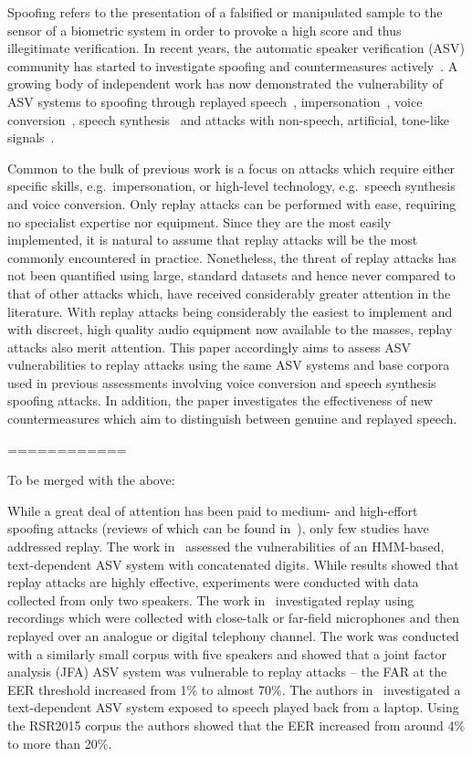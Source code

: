 

Spoofing refers to the presentation of a falsified or manipulated sample 
to the sensor of a biometric system in order to provoke a high score and 
thus illegitimate verification.
In recent years, the automatic speaker verification (ASV) community has 
started to investigate spoofing and countermeasures 
actively~\cite{interspeechSpecialSession, Wu2014a}. 
A growing 
body of independent work has now demonstrated the vulnerability of ASV 
systems to spoofing through 
replayed speech~\cite{Lindberg1999,Villalba2010},
impersonation~\cite{Blomberg2004,Farrus2008}, voice 
conversion~\cite{Perrot2005, Pellom1999}, speech 
synthesis~\cite{Masuko1999, Leon2010} and attacks with non-speech, 
artificial, tone-like signals~\cite{Alegre2012b}.

Common to the bulk of previous work is a focus on attacks 
which require either specific skills, e.g.~impersonation, or high-level 
technology, e.g.~speech synthesis and voice conversion. 
Only replay attacks can be performed with ease, requiring no specialist 
expertise nor equipment.  Since they are the most easily 
implemented, it is natural to assume that replay attacks will be the 
most commonly encountered in practice.  Nonetheless, the threat of 
replay attacks has not been quantified using large, standard 
datasets and hence never compared to that of other attacks which, have 
received considerably greater attention in the literature.
With replay attacks being considerably the easiest to implement
and with discreet, high quality audio equipment now available to the masses,
replay attacks also merit attention.
This paper accordingly aims to assess ASV vulnerabilities 
to replay attacks using the same ASV systems and base corpora used in 
previous assessments involving voice conversion and speech synthesis 
spoofing attacks.  In addition, the paper investigates the effectiveness of 
new countermeasures which aim to distinguish between genuine and replayed speech.  


============

To be merged with the above:

While a great deal of attention has been paid to medium- and high-effort spoofing attacks (reviews of which can be found in~\cite{Wu2014a,handbookChapter}), only few studies have addressed replay.  
The work in~\cite{Lindberg1999} assessed the vulnerabilities of an HMM-based, text-dependent ASV system with concatenated digits.  
While results showed that replay attacks are highly effective, experiments were conducted with data collected from only two speakers.
The work in~\cite{Villalba2010} investigated replay using recordings which were collected with close-talk or far-field microphones and then replayed over an analogue or digital telephony channel. 
The work was conducted with a similarly small corpus with five speakers and showed that a joint factor analysis (JFA) ASV system was vulnerable to replay attacks -- the FAR at the EER threshold increased from 1\% to almost 70\%. The authors in~\cite{Wu2014} investigated a text-dependent ASV system exposed to speech played back from a laptop. Using the RSR2015 corpus the authors showed that the EER increased from around 4\% to more than 20\%.


